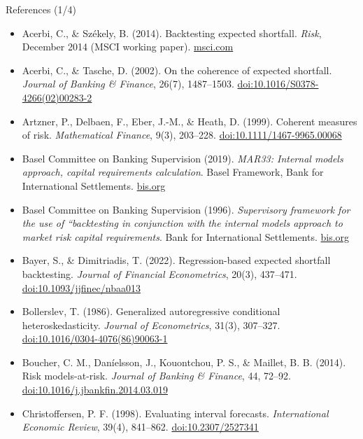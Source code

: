 \begin{frame}{References (1/4)}
\itemsize{\tiny}
\begin{itemize}
    \item Acerbi, C., \& Székely, B. (2014). Backtesting expected shortfall. \textit{Risk}, December 2014 (MSCI working paper). \href{https://www.msci.com/documents/10199/22aa9922-f874-4060-b77a-0f0e267a489b}{msci.com}
    \item Acerbi, C., \& Tasche, D. (2002). On the coherence of expected shortfall. \textit{Journal of Banking \& Finance}, 26(7), 1487--1503. \href{https://doi.org/10.1016/S0378-4266(02)00283-2}{doi:10.1016/S0378-4266(02)00283-2}
    \item Artzner, P., Delbaen, F., Eber, J.-M., \& Heath, D. (1999). Coherent measures of risk. \textit{Mathematical Finance}, 9(3), 203--228. \href{https://doi.org/10.1111/1467-9965.00068}{doi:10.1111/1467-9965.00068}
    \item Basel Committee on Banking Supervision (2019). \textit{MAR33: Internal models approach, capital requirements calculation}. Basel Framework, Bank for International Settlements. \href{https://www.bis.org/basel_framework/chapter/MAR/33.htm}{bis.org}
    \item Basel Committee on Banking Supervision (1996). \textit{Supervisory framework for the use of ``backtesting in conjunction with the internal models approach to market risk capital requirements}. Bank for International Settlements. \href{https://www.bis.org/publ/bcbs22.htm}{bis.org}
    \item Bayer, S., \& Dimitriadis, T. (2022). Regression-based expected shortfall backtesting. \textit{Journal of Financial Econometrics}, 20(3), 437--471. \href{https://doi.org/10.1093/jjfinec/nbaa013}{doi:10.1093/jjfinec/nbaa013}
    \item Bollerslev, T. (1986). Generalized autoregressive conditional heteroskedasticity. \textit{Journal of Econometrics}, 31(3), 307--327. \href{https://doi.org/10.1016/0304-4076(86)90063-1}{doi:10.1016/0304-4076(86)90063-1}
    \item Boucher, C. M., Daníelsson, J., Kouontchou, P. S., \& Maillet, B. B. (2014). Risk models-at-risk. \textit{Journal of Banking \& Finance}, 44, 72--92. \href{https://doi.org/10.1016/j.jbankfin.2014.03.019}{doi:10.1016/j.jbankfin.2014.03.019}
    \item Christoffersen, P. F. (1998). Evaluating interval forecasts. \textit{International Economic Review}, 39(4), 841--862. \href{https://doi.org/10.2307/2527341}{doi:10.2307/2527341}

\end{itemize}
\end{frame}
